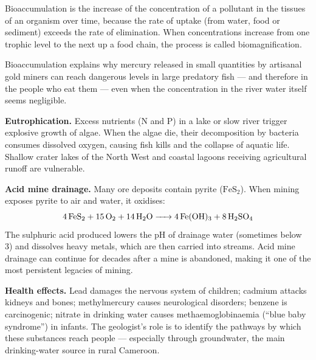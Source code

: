 \documentclass[11pt]{article}
\newcommand{\cle}[1]{{\popxbold\color{popdark}#1}}
\begin{document}
\begin{definition}[Bioaccumulation]
\cle{Bioaccumulation} is the increase of the concentration of a pollutant in the tissues of an organism over time, because the rate of uptake (from water, food or sediment) exceeds the rate of elimination. When concentrations increase from one trophic level to the next up a food chain, the process is called \cle{biomagnification}.
\end{definition}

Bioaccumulation explains why mercury released in small quantities by artisanal gold miners can reach dangerous levels in large predatory fish — and therefore in the people who eat them — even when the concentration in the river water itself seems negligible.

\textbf{Eutrophication.} Excess nutrients (N and P) in a lake or slow river trigger explosive growth of algae. When the algae die, their decomposition by bacteria consumes dissolved oxygen, causing fish kills and the collapse of aquatic life. Shallow crater lakes of the North West and coastal lagoons receiving agricultural runoff are vulnerable.

\textbf{Acid mine drainage.} Many ore deposits contain pyrite ($\mathrm{FeS_2}$). When mining exposes pyrite to air and water, it oxidises:
\[ \ce{4FeS2 + 15O2 + 14H2O -> 4Fe(OH)3 + 8H2SO4} \]
The sulphuric acid produced lowers the pH of drainage water (sometimes below 3) and dissolves heavy metals, which are then carried into streams. Acid mine drainage can continue for decades after a mine is abandoned, making it one of the most persistent legacies of mining.

\textbf{Health effects.} Lead damages the nervous system of children; cadmium attacks kidneys and bones; methylmercury causes neurological disorders; benzene is carcinogenic; nitrate in drinking water causes methaemoglobinaemia (``blue baby syndrome'') in infants. The geologist's role is to identify the pathways by which these substances reach people — especially through groundwater, the main drinking-water source in rural Cameroon.
\end{document}
